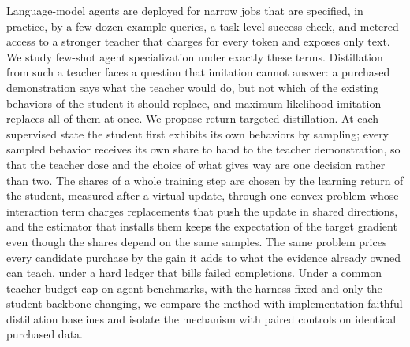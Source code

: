 Language-model agents are deployed for narrow jobs that are specified,
in practice, by a few dozen example queries, a task-level success
check, and metered access to a stronger teacher that charges for every
token and exposes only text. We study few-shot agent specialization
under exactly these terms. Distillation from such a teacher faces a
question that imitation cannot answer: a purchased demonstration says
what the teacher would do, but not which of the existing behaviors of
the student it should replace, and maximum-likelihood imitation
replaces all of them at once. We propose return-targeted distillation.
At each supervised state the student first exhibits its own behaviors
by sampling; every sampled behavior receives its own share to hand to
the teacher demonstration, so that the teacher dose and the choice of
what gives way are one decision rather than two. The shares of a whole
training step are chosen by the learning return of the student,
measured after a virtual update, through one convex problem whose
interaction term charges replacements that push the update in shared
directions, and the estimator that installs them keeps the
expectation of the target gradient even though the shares depend on
the same samples. The same problem prices every candidate purchase by
the gain it adds to what the evidence already owned can teach, under a
hard ledger that bills failed completions. Under a common teacher
budget cap on agent benchmarks, with the harness fixed and only the
student backbone changing, we compare the method with
implementation-faithful distillation baselines and isolate the
mechanism with paired controls on identical purchased data.
